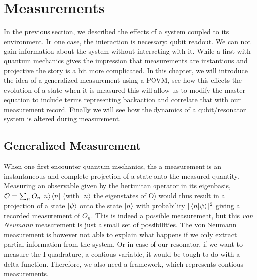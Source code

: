 \chapter{Measurements}
In the previous section, we described the effects of a system coupled to its environment. In one case, the interaction is necessary: qubit readout. We can not gain information about the system without interacting with it. While a first with quantum mechanics gives the impression that measurements are instantious and projective the story is a bit more complicated. In this chapter, we will introduce the idea of a generalized measurement using a POVM, see how this effects the evolution of a state when it is measured this will allow us to modify the master equation to include terms representing backaction and correlate that with our measurement record. Finally we will see how the dynamics of a qubit/resonator system is altered during measurement.

\section{Generalized Measurement}
 \noindent
When one first encounter quantum mechanics, the a measurement is an instantaneous and complete projection of a state onto the measured quantity. Measuring an observable given by the hertmitan operator in its eigenbasis, $\mathcal{O} = \sum_n O_n \ket{n}\bra{n}$ (with $\ket{n}$ the eigenstates of O) would thus result in a projection of a state $\ket{\psi}$ onto the state $\ket{n}$ with probability $|\braket{n}{\psi}|^2$ giving a recorded measurement of $O_n$.  This is indeed a possible measurement, but this \textit{von Neumann} measurement is just a small set of possibilities. The von Neumann measurement is however not able to explain what happens if we only extract partial information from the system. Or in case of our resonator, if we want to measure the I-quadrature, a contious variable, it would be tough to do with a delta function. Therefore, we also need a framework, which represents contious measurements. 

